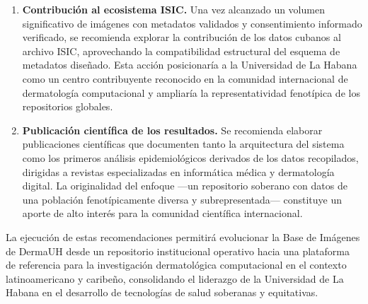 \begin{recomendations}
\begin{enumerate}
    \item \textbf{Contribución al ecosistema ISIC.} Una vez alcanzado un volumen significativo de 
    imágenes con metadatos validados y consentimiento informado verificado, se recomienda explorar la 
    contribución de los datos cubanos al archivo ISIC, aprovechando la compatibilidad estructural del 
    esquema de metadatos diseñado. Esta acción posicionaría a la Universidad de La Habana como un centro 
    contribuyente reconocido en la comunidad internacional de dermatología computacional y ampliaría la 
    representatividad fenotípica de los repositorios globales.

    \item \textbf{Publicación científica de los resultados.} Se recomienda elaborar publicaciones 
    científicas que documenten tanto la arquitectura del sistema como los primeros análisis 
    epidemiológicos derivados de los datos recopilados, dirigidas a revistas especializadas en 
    informática médica y dermatología digital. La originalidad del enfoque ---un repositorio soberano 
    con datos de una población fenotípicamente diversa y subrepresentada--- constituye un aporte de alto 
    interés para la comunidad científica internacional.
\end{enumerate}

La ejecución de estas recomendaciones permitirá evolucionar la Base de Imágenes de DermaUH desde un 
repositorio institucional operativo hacia una plataforma de referencia para la investigación dermatológica 
computacional en el contexto latinoamericano y caribeño, consolidando el liderazgo de la Universidad de 
La Habana en el desarrollo de tecnologías de salud soberanas y equitativas.
\end{recomendations}

